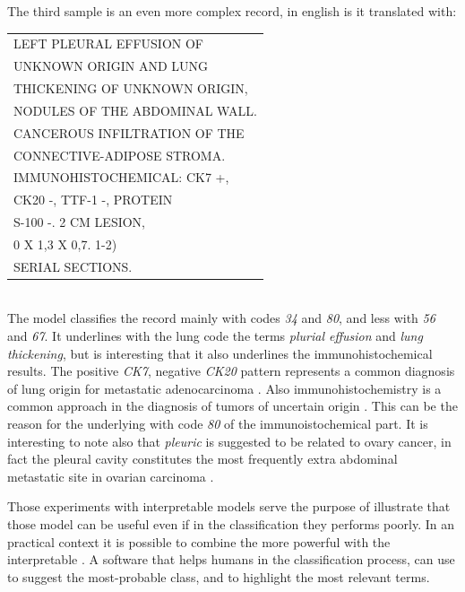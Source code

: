 The third sample is an even more complex record, in english is it
translated with:\\
\begin{small}
  \ttfamily
  \begin{tabular}{l}
    LEFT PLEURAL EFFUSION OF\\
    UNKNOWN ORIGIN AND LUNG\\
    THICKENING OF UNKNOWN ORIGIN,\\
    NODULES OF THE ABDOMINAL WALL.\\
    CANCEROUS INFILTRATION OF THE\\
    CONNECTIVE-ADIPOSE STROMA.\\
    IMMUNOHISTOCHEMICAL: CK7 +,\\
    CK20 -, TTF-1 -, PROTEIN\\
    S-100 -. 2 CM LESION,\\
    0 X 1,3 X 0,7. 1-2)\\
    SERIAL SECTIONS.
\end{tabular}
\end{small}\\
The model classifies the record mainly with codes \emph{34} and
\emph{80}, and less with \emph{56} and \emph{67}. It underlines with
the lung code the terms
\emph{plurial effusion} and \emph{lung thickening}, but is interesting
that it also underlines the immunohistochemical results. The
positive \emph{CK7}, negative \emph{CK20} pattern represents a common
diagnosis 
of lung origin for metastatic adenocarcinoma
\cite{kummar2002cytokeratin}. Also immunohistochemistry is a common
approach in the diagnosis of tumors of uncertain origin
\cite{duraiyan2012applications}. This can be the reason for the
underlying with code \emph{80} of the immunoistochemical part.
It is interesting to note also that \emph{pleuric} is
suggested to be related to ovary cancer, in fact the pleural cavity
constitutes the most frequently extra abdominal metastatic site in
ovarian carcinoma \cite{porcel2012pleural}.

Those experiments with interpretable models serve the purpose of
illustrate that those model can be useful even if in the
classification they performs poorly. In an practical context it is
possible to combine the more powerful \maxp{} with the interpretable
\maxi{}. A software that helps humans in the classification process,
can use \maxp{} to suggest the most-probable class, and \maxi{} to
highlight the most relevant terms.

